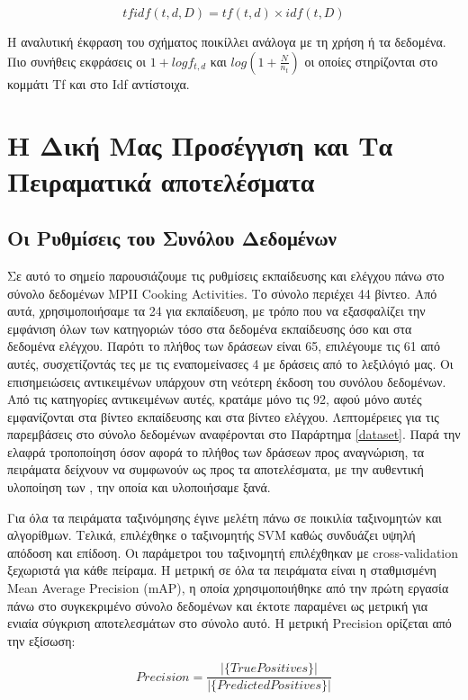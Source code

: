 \documentclass[11pt,a4paper,english,greek,twoside]{../Thesis}
\begin{document}
\begin{equation}\label{eq:Tfidf}
    tfidf(t,d,D)=tf(t,d) \times idf(t,D)
\end{equation}

Η αναλυτική έκφραση του σχήματος ποικίλλει ανάλογα με τη χρήση ή τα δεδομένα. Πιο συνήθεις εκφράσεις οι $1+logf_{t,d}$ και $log(1+\frac{N}{n_t})$ οι οποίες στηρίζονται στο κομμάτι Tf και στο Idf αντίστοιχα.


\section{Η Δική Μας Προσέγγιση και Τα Πειραματικά αποτελέσματα}
\subsection{Οι Ρυθμίσεις του Συνόλου Δεδομένων}
Σε αυτό το σημείο παρουσιάζουμε τις ρυθμίσεις εκπαίδευσης και ελέγχου πάνω στο σύνολο δεδομένων MPII Cooking Activities. Το σύνολο περιέχει 44 βίντεο. Από αυτά, χρησιμοποιήσαμε τα 24 για εκπαίδευση, με τρόπο που να εξασφαλίζει την εμφάνιση όλων των κατηγοριών τόσο στα δεδομένα εκπαίδευσης όσο και στα δεδομένα ελέγχου. Παρότι το πλήθος των δράσεων είναι 65, επιλέγουμε τις 61 από αυτές, συσχετίζοντάς τες με τις εναπομείνασες 4 με δράσεις από το λεξιλόγιό μας. Οι επισημειώσεις αντικειμένων υπάρχουν στη νεότερη έκδοση του συνόλου δεδομένων. Από τις κατηγορίες αντικειμένων αυτές, κρατάμε μόνο τις 92, αφού μόνο αυτές εμφανίζονται στα βίντεο εκπαίδευσης και στα βίντεο ελέγχου. Λεπτομέρειες για τις παρεμβάσεις στο σύνολο δεδομένων αναφέρονται στο Παράρτημα \ref{dataset}. Παρά την ελαφρά τροποποίηση όσον αφορά το πλήθος των δράσεων προς αναγνώριση, τα πειράματα δείχνουν να συμφωνούν ως προς τα αποτελέσματα, με την αυθεντική υλοποίηση των \cite{rohrbach_2012}, την οποία και υλοποιήσαμε ξανά.

\par Για όλα τα πειράματα ταξινόμησης έγινε μελέτη πάνω σε ποικιλία ταξινομητών και αλγορίθμων. Τελικά, επιλέχθηκε ο ταξινομητής SVM καθώς συνδυάζει υψηλή απόδοση και επίδοση. Οι παράμετροι του ταξινομητή επιλέχθηκαν με cross-validation ξεχωριστά για κάθε πείραμα. Η μετρική σε όλα τα πειράματα είναι η σταθμισμένη Mean Average Precision (mAP), η οποία χρησιμοποιήθηκε από την πρώτη εργασία πάνω στο συγκεκριμένο σύνολο δεδομένων \cite{rohrbach_2012} και έκτοτε παραμένει ως μετρική για ενιαία σύγκριση αποτελεσμάτων στο σύνολο αυτό. Η μετρική Precision ορίζεται από την εξίσωση:

\begin{equation}\label{eq:Precision}
    Precision=\frac{|\{True Positives\}|}{|\{Predicted Positives\}|}
\end{equation}
\end{document}
